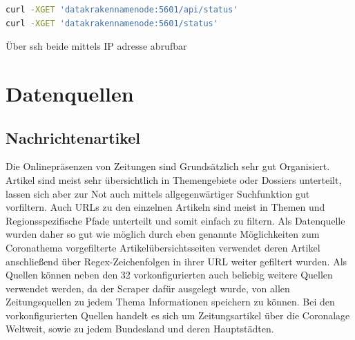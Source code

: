 \documentclass[12pt,oneside,a4paper,parskip]{scrbook}
\begin{document}
\begin{lstlisting}[caption=Statusabfrage Kibana,label=statuskibana,language=bash]
curl -XGET 'datakrakennamenode:5601/api/status'
curl -XGET 'datakrakennamenode:5601/status'
\end{lstlisting}

Über ssh beide mittels IP adresse abrufbar

\chapter{Datenquellen}
\section{Nachrichtenartikel}
Die Onlinepräsenzen von Zeitungen sind Grundsätzlich sehr gut Organisiert. Artikel sind meist sehr übersichtlich in Themengebiete oder Dossiers unterteilt, lassen sich aber zur Not auch mittels allgegenwärtiger Suchfunktion gut vorfiltern. Auch URLs zu den einzelnen Artikeln sind meist in Themen und Regionsspezifische Pfade unterteilt und somit einfach zu filtern. Als Datenquelle wurden daher so gut wie möglich durch eben genannte Möglichkeiten zum Coronathema vorgefilterte Artikelübersichtsseiten verwendet deren Artikel anschließend über Regex-Zeichenfolgen in ihrer URL weiter gefiltert wurden. Als Quellen können neben den 32 vorkonfigurierten auch beliebig weitere Quellen verwendet werden, da der Scraper dafür ausgelegt wurde, von allen Zeitungsquellen zu jedem Thema Informationen speichern zu können. Bei den vorkonfigurierten Quellen handelt es sich um Zeitungsartikel über die Coronalage Weltweit, sowie zu jedem Bundesland und deren Hauptstädten. 
\end{document}
